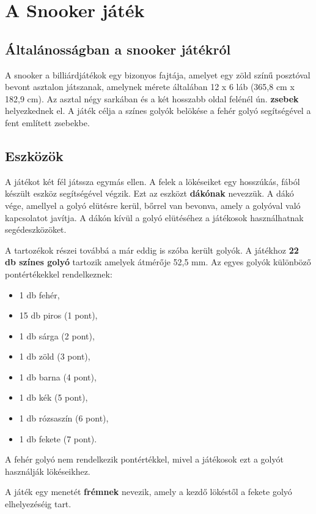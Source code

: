 \chapter{A Snooker játék}

\section{Általánosságban a snooker játékról}
A snooker a billiárdjátékok egy bizonyos fajtája, amelyet egy zöld színű posztóval bevont asztalon játszanak, amelynek mérete általában 12 x 6 láb (365,8 cm x 182,9 cm)\cite{snooker_rules}. Az asztal négy sarkában és a két hosszabb oldal felénél ún. \textbf{zsebek} helyezkednek el. A játék célja a színes golyók belökése a fehér golyó segítségével a fent említett zsebekbe.

\section{Eszközök}
A játékot két fél játssza egymás ellen. A felek a lökéseiket egy hosszúkás, fából készült eszköz segítségével végzik. Ezt az eszközt \textbf{dákónak} nevezzük. A dákó vége, amellyel a golyó elütésre kerül, bőrrel van bevonva, amely a golyóval való kapcsolatot javítja. A dákón kívül a golyó elütéséhez a játékosok használhatnak segédeszközöket.
\par A tartozékok részei továbbá a már eddig is szóba került golyók. A játékhoz \textbf{22 db színes golyó} tartozik amelyek átmérője 52,5 mm.\cite{snooker_rules}
\newline Az egyes golyók különböző pontértékekkel rendelkeznek:\cite{snooker_rules}
\begin{itemize}
    \setlength\itemsep{-2pt}
    \item 1 db fehér,
    \item 15 db piros (1 pont),
    \item 1 db sárga (2 pont),
    \item 1 db zöld (3 pont),
    \item 1 db barna (4 pont),
    \item 1 db kék (5 pont),
    \item 1 db rózsaszín (6 pont),
    \item 1 db fekete (7 pont).
\end{itemize}
A fehér golyó nem rendelkezik pontértékkel, mivel a játékosok ezt a golyót használják lökéseikhez.
\par A játék egy menetét \textbf{frémnek} nevezik, amely a kezdő lökéstől a fekete golyó elhelyezéséig tart.\cite{snooker_rules}
